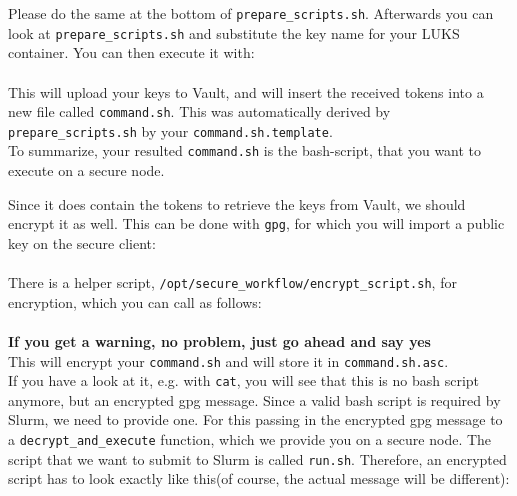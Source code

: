\documentclass[paper=a4]{scrartcl}
\begin{document}
Please do the same at the bottom of \texttt{prepare\_scripts.sh}. 
Afterwards you can look at \texttt{prepare\_scripts.sh} and substitute the key name for your LUKS container.
You can then execute it with: \\
 \\
This will upload your keys to Vault, and will insert the received tokens into a new file called \texttt{command.sh}. This was automatically derived by \texttt{prepare\_scripts.sh} by your \texttt{command.sh.template}. 
\\
To summarize, your resulted \texttt{command.sh} is the bash-script,  that you want to execute on a secure node. 


Since it does contain the tokens to retrieve the keys from Vault, we should encrypt it as well. 
This can be done with \texttt{gpg}, for which you will import a public key on the secure client: \\
\\
There is a helper script,  \texttt{/opt/secure\_workflow/encrypt\_script.sh}, for encryption, which you can call as follows: \\
 \\
\textbf{If you get a warning, no problem, just go ahead and say yes} \\
This will encrypt your \texttt{command.sh} and will store it in \texttt{command.sh.asc}. 
\\
If you have a look at it, e.g. with \texttt{cat}, you will see that this is no bash script anymore, but an encrypted gpg message.
Since a valid bash script is required by Slurm, we need to provide one. 
For this passing in the encrypted gpg message to a \texttt{decrypt\_and\_execute} function, which we provide you on a secure node. 
The script that we want to submit to Slurm is called \texttt{run.sh}. 
Therefore, an encrypted script has to look exactly like this(of course, the actual message will be different): \\
\end{document}
